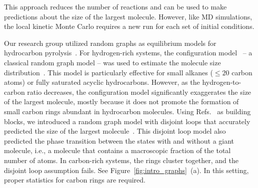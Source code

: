 \documentclass[fleqn,11pt]{article}
\begin{document}
This approach reduces the number of reactions and can be used to make predictions about the size of the largest molecule. 
However, like MD simulations, the local kinetic Monte Carlo requires a new run for each set of initial conditions. 

Our research group utilized random graphs as equilibrium models for hydrocarbon pyrolysis~\cite{dufour-decieuxPredicting2023,ruthCyclic2025}. 
For hydrogen-rich systems, the configuration model~\cite{newmanRandom2001,molloySize1998} -- a classical random graph model -- was used to estimate the molecule size distribution~\cite{dufour-decieuxPredicting2023}. 
This model is particularly effective for small alkanes ($\le20$ carbon atoms) or fully saturated acyclic hydrocarbons.
However, as the hydrogen-to-carbon ratio decreases, the configuration model significantly exaggerates the size of the largest molecule, mostly because it does not promote the formation of small carbon rings abundant in hydrocarbon molecules.
Using Refs.~\cite{karrerRandom2010,newmanAssortative2002} as building blocks, we introduced a random graph model with disjoint loops that accurately predicted the size of the largest molecule~\cite{ruthCyclic2025}. This disjoint loop model also predicted the phase transition between the states with and without a giant molecule, i.e., a molecule that contains a macroscopic fraction of the total number of atoms. 
In carbon-rich systems, the rings cluster together, and the disjoint loop assumption fails. See Figure~\ref{fig:intro_graphs}~(a). In this setting, proper statistics for carbon rings are required.
\end{document}
